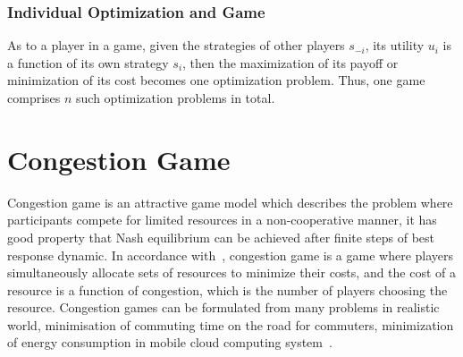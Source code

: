 

\subsubsection*{Individual Optimization and Game}
As to a player in a game, given the strategies of other players $s_{-i}$, its utility $u_i$ is a function of its own strategy $s_i$, then the maximization of its payoff or minimization of its cost becomes one optimization problem.
Thus, one game comprises $n$ such optimization problems in total.





\section{Congestion Game}







Congestion game is an attractive game model which describes the problem where participants compete for limited resources in a non-cooperative manner, it has good property that Nash equilibrium can be achieved after finite steps of best response dynamic.
In accordance with~\cite{Voecking06congestiongames}, congestion game is a game where players simultaneously allocate sets of resources to minimize their costs, and the cost of a resource is a function of congestion, which is the number of players choosing the resource.
Congestion games can be formulated from many problems in realistic world, \eg minimisation of commuting time on the road for commuters, minimization of energy consumption in mobile cloud computing system~\cite{game_cloudcomputing_energy12}.


